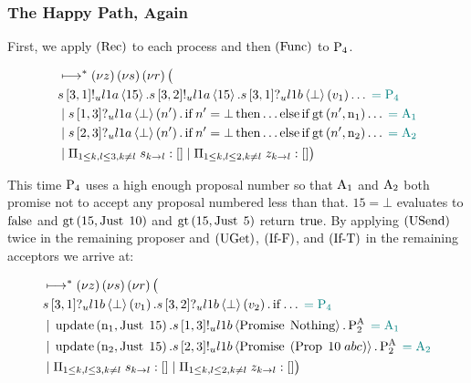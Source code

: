 
\subsubsection{The Happy Path, Again}

First, we apply $\left(\operatorname{Rec}\right)$ to each process and then $\left(\operatorname{Func}\right)$ to $\operatorname{P_{4}}$.

\begin{align*}
&\mapstostar \NuChannels \big (\\
&
    \SendUnreliableP{\ChannelS}{3}{1}{\LOneA}{15}.
    \SendUnreliableP{\ChannelS}{3}{2}{\LOneA}{15}.
    \ReceiveUnreliableP{\ChannelS}{3}{1}{\LOneB}{\bot}{v_1}\ldots
    \comment{= \Proposer{4}}\\
&\Or
    \ReceiveUnreliableP{\ChannelS}{1}{3}{\LOneA}{\bot}{n'}.
    \If{n' = \bot}
    \Then{\ldots}
    \Else{
        \If{\greaterThan{n'}{\NumberRegister_1}}\ldots
    }
    \comment{= \Acceptor{1}}\\
&\Or
    \ReceiveUnreliableP{\ChannelS}{2}{3}{\LOneA}{\bot}{n'}.
    \If{n' = \bot}
    \Then{\ldots}
    \Else{
        \If{\greaterThan{n'}{\NumberRegister_2}}\ldots
    }
    \comment{= \Acceptor{2}}\\
&\Or \InnerSessionQueues{\ChannelS}
\Or \OuterSessionQueues
\big )
\end{align*}

This time $\operatorname{P_{4}}$ uses a high enough proposal number so that $\operatorname{A_{1}}$ and $\operatorname{A_{2}}$ both promise not to accept any proposal numbered less than that.
$15 = \bot$ evaluates to $\operatorname{false}$ and $\operatorname{gt}\left(15, \operatorname{Just}\; 10\right)$ and $\operatorname{gt}\left(15, \operatorname{Just}\; 5\right)$ return $\operatorname{true}$.
By applying $\left(\operatorname{USend}\right)$ twice in the remaining proposer and $\left(\operatorname{UGet}\right)$, $\left(\operatorname{If-F}\right)$, and $\left(\operatorname{If-T}\right)$ in the remaining acceptors we arrive at:

\begin{align*}
&\longmapsto^* \left(\nu z\right)\left(\nu s\right)\left(\nu r\right) \big (\\
&
    s\left[3, 1\right]?_u l1b \left\langle \bot \right\rangle \left(v_1\right).
    s\left[3, 2\right]?_u l1b \left\langle \bot \right\rangle \left(v_2\right).
    \operatorname{if} \ldots
    \;\textcolor{teal}{= \operatorname{P_{4}}}\\
&\; | \;
    \operatorname{update} \left(\operatorname{n}_1, \operatorname{Just}\; 15\right).
    s\left[1, 3\right]!_u l1b \left\langle \operatorname{Promise}\; \operatorname{Nothing} \right\rangle.
    \operatorname{P^{A}_{2}}
    \;\textcolor{teal}{= \operatorname{A_{1}}}\\
&\; | \;
    \operatorname{update} \left(\operatorname{n}_2, \operatorname{Just}\; 15\right).
    s\left[2, 3\right]!_u l1b \left\langle \operatorname{Promise}\; \left(\operatorname{Prop}\; 10\; abc\right) \right\rangle.
    \operatorname{P^{A}_{2}} \;\textcolor{teal}{= \operatorname{A_{2}}}\\
&\; | \; \Pi_{1 \le k,l \le 3, k \neq l}\; s_{k\to l}:[]
\; | \; \Pi_{1 \le k,l \le 2, k \neq l}\; z_{k\to l}:[]
\big )
\end{align*}

